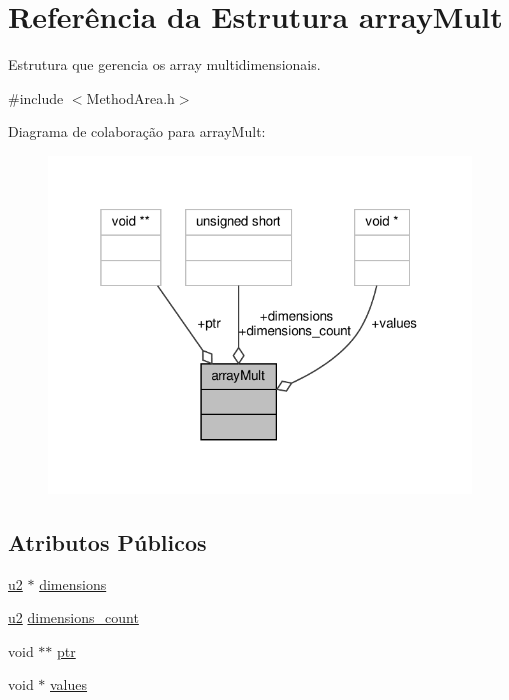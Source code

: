 \hypertarget{structarrayMult}{}\section{Referência da Estrutura array\+Mult}
\label{structarrayMult}


Estrutura que gerencia os array multidimensionais.  




{\ttfamily \#include $<$Method\+Area.\+h$>$}



Diagrama de colaboração para array\+Mult\+:\nopagebreak
\begin{figure}[H]
\begin{center}
\leavevmode
\includegraphics[width=319pt]{structarrayMult__coll__graph}
\end{center}
\end{figure}
\subsection*{Atributos Públicos}
\begin{DoxyCompactItemize}
\item 
\hyperlink{ClassLoader_8h_a5f223212eef04d10a4550ded680cb1cf}{u2} $\ast$ \hyperlink{structarrayMult_a32a40b7692ac520541539fe93367fb91}{dimensions}
\item 
\hyperlink{ClassLoader_8h_a5f223212eef04d10a4550ded680cb1cf}{u2} \hyperlink{structarrayMult_ad6c84cfce9d33584b955a601503867f1}{dimensions\+\_\+count}
\item 
void $\ast$$\ast$ \hyperlink{structarrayMult_a86583447f9a0c1c28284dd7f8476da24}{ptr}
\item 
void $\ast$ \hyperlink{structarrayMult_a5ed19e9ddbbc82d55d0800eca4ad4902}{values}
\end{DoxyCompactItemize}



